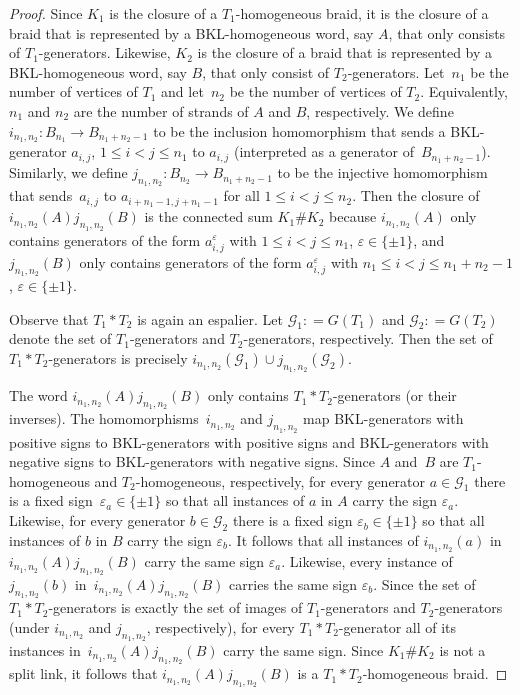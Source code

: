 \documentclass{amsart}
\theoremstyle{definition}
\theoremstyle{remark}
\theoremstyle{plain}
\newcommand{\defeq}{\mathrel{\mathop:}=}
\begin{document}
\begin{proof}
Since $K_1$ is the closure of a $T_1$-homogeneous braid, it is the closure of a braid that is represented by a BKL-homogeneous word, say $A$, that only consists of $T_1$-generators. Likewise, $K_2$ is the closure of a braid that is represented by a BKL-homogeneous word, say $B$, that only consist of $T_2$-generators.
Let~$n_1$ be the number of vertices of $T_1$ and let~$n_2$ be the number of vertices of $T_2$. Equivalently, $n_1$ and $n_2$ are the number of strands of $A$ and $B$, respectively.  We define $i_{n_1,n_2}:B_{n_1}\to B_{n_1+n_2-1}$ to be the inclusion homomorphism that sends a BKL-generator $a_{i,j}$, $1\leq i<j\leq n_1$ to $a_{i,j}$ (interpreted as a generator of~$B_{n_1+n_2-1}$). Similarly, we define $j_{n_1,n_2}:B_{n_2}\to B_{n_1+n_2-1}$ to be the injective homomorphism that sends~$a_{i,j}$ to $a_{i+n_1-1,j+n_1-1}$ for all $1\leq i<j\leq n_2$.
Then the closure of $i_{n_1,n_2}(A)j_{n_1,n_2}(B)$ is the connected sum $K_1\# K_2$ because $i_{n_1,n_2}(A)$ only contains generators of the form $a_{i,j}^{\varepsilon}$ with $1\leq i<j\leq n_1$, $\varepsilon\in\{\pm 1\}$, and $j_{n_1,n_2}(B)$ only contains generators of the form $a_{i,j}^{\varepsilon}$ with $n_1\leq i<j\leq n_1+n_2-1$, $\varepsilon\in\{\pm 1\}$.

Observe that $T_1*T_2$ is again an espalier. Let $\mathcal{G}_1 \defeq G(T_1)$ and $\mathcal{G}_2 \defeq G(T_2)$ denote the set of $T_1$-generators and $T_2$-generators, respectively. Then the set of $T_1*T_2$-generators is precisely $i_{n_1,n_2}(\mathcal{G}_1)\cup j_{n_1,n_2}(\mathcal{G}_2)$.

The word $i_{n_1,n_2}(A)j_{n_1,n_2}(B)$ only contains $T_1*T_2$-generators (or their inverses). The homomorphisms~$i_{n_1,n_2}$ and $j_{n_1,n_2}$ map BKL-generators with positive signs to BKL-generators with positive signs and BKL-generators with negative signs to BKL-generators with negative signs. Since $A$ and~$B$ are $T_1$-homogeneous and $T_2$-homogeneous, respectively, for every generator $a\in \mathcal{G}_1$ there is a fixed sign~$\varepsilon_a\in\{\pm 1\}$ so that all instances of $a$ in $A$ carry the sign $\varepsilon_a$. Likewise, for every generator $b\in \mathcal{G}_2$ there is a fixed sign $\varepsilon_b\in\{\pm 1\}$ so that all instances of $b$ in $B$ carry the sign $\varepsilon_b$. It follows that all instances of $i_{n_1,n_2}(a)$ in $i_{n_1,n_2}(A)j_{n_1,n_2}(B)$ carry the same sign $\varepsilon_a$. Likewise, every instance of $j_{n_1,n_2}(b)$ in~$i_{n_1,n_2}(A)j_{n_1,n_2}(B)$ carries the same sign $\varepsilon_b$. Since the set of $T_1*T_2$-generators is exactly the set of images of $T_1$-generators and $T_2$-generators (under $i_{n_1,n_2}$ and $j_{n_1,n_2}$, respectively), for every $T_1*T_2$-generator all of its instances in~$i_{n_1,n_2}(A)j_{n_1,n_2}(B)$ carry the same sign. Since $K_1\# K_2$ is not a split link, it follows that $i_{n_1,n_2}(A)j_{n_1,n_2}(B)$ is a $T_1*T_2$-homogeneous braid.
\end{proof}
\end{document}
